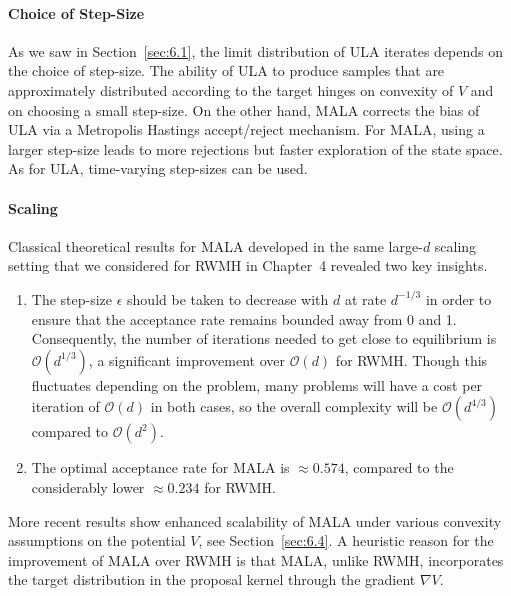 \paragraph{Choice of Step-Size}
As we saw in Section~\ref{sec:6.1}, the limit distribution of ULA iterates depends on the
choice of step-size. The ability of ULA to produce samples that are approximately distributed
according to the target hinges on convexity of $V$ and on choosing a small step-size. On the
other hand, MALA corrects the bias of ULA via a Metropolis Hastings accept/reject mechanism.
For MALA, using a larger step-size leads to more rejections but faster exploration of the state
space. As for ULA, time-varying step-sizes can be used.

\paragraph{Scaling}
Classical theoretical results for MALA developed in the same large-$d$ scaling setting that we
considered for RWMH in Chapter~4 revealed two key insights.
\begin{enumerate}
  \item The step-size $\epsilon$ should be taken to decrease with $d$ at rate $d^{-1/3}$ in
    order to ensure that the acceptance rate remains bounded away from 0 and 1. Consequently,
    the number of iterations needed to get close to equilibrium is $\mathcal{O}(d^{1/3})$, a
    significant improvement over $\mathcal{O}(d)$ for RWMH. Though this fluctuates depending
    on the problem, many problems will have a cost per iteration of $\mathcal{O}(d)$ in both
    cases, so the overall complexity will be $\mathcal{O}(d^{4/3})$ compared to
    $\mathcal{O}(d^2)$.

  \item The optimal acceptance rate for MALA is $\approx 0.574$, compared to the considerably
    lower $\approx 0.234$ for RWMH.
\end{enumerate}

More recent results show enhanced scalability of MALA under various convexity assumptions on
the potential $V$, see Section~\ref{sec:6.4}. A heuristic reason for the improvement of MALA
over RWMH is that MALA, unlike RWMH, incorporates the target distribution in the proposal
kernel through the gradient $\nabla V$.
